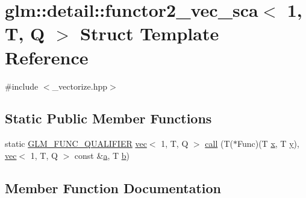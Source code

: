 \hypertarget{structglm_1_1detail_1_1functor2__vec__sca_3_011_00_01_t_00_01_q_01_4}{}\section{glm\+:\+:detail\+:\+:functor2\+\_\+vec\+\_\+sca$<$ 1, T, Q $>$ Struct Template Reference}
\label{structglm_1_1detail_1_1functor2__vec__sca_3_011_00_01_t_00_01_q_01_4}


{\ttfamily \#include $<$\+\_\+vectorize.\+hpp$>$}

\subsection*{Static Public Member Functions}
\begin{DoxyCompactItemize}
\item 
static \hyperlink{setup_8hpp_a33fdea6f91c5f834105f7415e2a64407}{G\+L\+M\+\_\+\+F\+U\+N\+C\+\_\+\+Q\+U\+A\+L\+I\+F\+I\+ER} \hyperlink{structglm_1_1vec}{vec}$<$ 1, T, Q $>$ \hyperlink{structglm_1_1detail_1_1functor2__vec__sca_3_011_00_01_t_00_01_q_01_4_a89645239c9fe91ac369acd3bc5cd544f}{call} (T($\ast$Func)(T \hyperlink{_s_d_l__opengl_8h_ad0e63d0edcdbd3d79554076bf309fd47}{x}, T \hyperlink{_s_d_l__opengl_8h_a1675d9d7bb68e1657ff028643b4037e3}{y}), \hyperlink{structglm_1_1vec}{vec}$<$ 1, T, Q $>$ const \&\hyperlink{_s_d_l__opengl__glext_8h_a3309789fc188587d666cda5ece79cf82}{a}, T \hyperlink{_s_d_l__opengl__glext_8h_a0f71581a41fd2264c8944126dabbd010}{b})
\end{DoxyCompactItemize}


\subsection{Member Function Documentation}
\mbox{\label{structglm_1_1detail_1_1functor2__vec__sca_3_011_00_01_t_00_01_q_01_4_a89645239c9fe91ac369acd3bc5cd544f}} 
